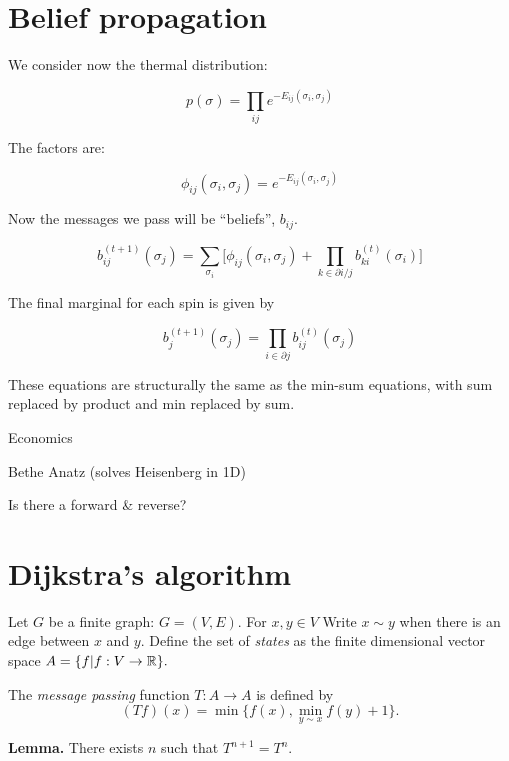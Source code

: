 \documentclass[11pt]{article}
\begin{document}
\section{Belief propagation}



We consider now the thermal distribution:

$$
    p(\sigma) = \prod_{ij} e^{-E_{ij}(\sigma_i, \sigma_j)}
$$

The factors are:

$$
\phi_{ij}(\sigma_i, \sigma_j) = e^{-E_{ij}(\sigma_i, \sigma_j)}
$$

Now the messages we pass will be ``beliefs'', $b_{ij}$.

$$
b_{ij}^{(t+1)}(\sigma_j) = \sum_{\sigma_i}\bigl[ \phi_{ij}(\sigma_i, \sigma_j)
  + \prod_{k\in \partial i/j} b_{ki}^{(t)}(\sigma_i) \bigr]
$$

The final marginal for each spin is given by

$$
    b_j^{(t+1)}(\sigma_j) = \prod_{i\in \partial j} b_{ij}^{(t)}(\sigma_j)
$$

These equations are structurally the same as the
min-sum equations, with sum replaced by product and
min replaced by sum.




Economics

Bethe Anatz (solves Heisenberg in 1D)

Is there a forward \& reverse?

%
%

\section{Dijkstra's algorithm}

Let $G$ be a finite graph: $G = (V, E).$
For $x,y\in V$ Write $x\sim y$ when there
is an edge between $x$ and $y.$ %
Define the set of \emph{states} as %
the finite dimensional vector space
$A = \{ f | f : V \to \mathbb R \}.$

The \emph{message passing} function
$T:A\to A$ is defined by
$$(Tf)(x) = \min\{f(x), \min_{y\sim x} f(y)+1\}.$$

{\bf Lemma.} There exists $n$ such that $T^{n+1} = T^n.$
\end{document}

